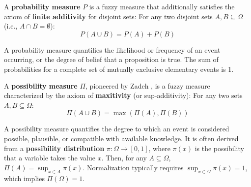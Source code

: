 \begin{definition}
A \textbf{probability measure} $P$ is a fuzzy measure that additionally satisfies the axiom of \textbf{finite additivity} for disjoint sets:
For any two disjoint sets $A, B \subseteq \Omega$ (i.e., $A \cap B = \emptyset$):
\[ P(A \cup B) = P(A) + P(B) \]
\end{definition}
A probability measure quantifies the likelihood or frequency of an event occurring, or the degree of belief that a proposition is true. The sum of probabilities for a complete set of mutually exclusive elementary events is 1.

\begin{definition}
A \textbf{possibility measure} $\Pi$, pioneered by Zadeh \cite{Zadeh1978}, is a fuzzy measure characterized by the axiom of \textbf{maxitivity} (or sup-additivity):
For any two sets $A, B \subseteq \Omega$:
\[ \Pi(A \cup B) = \max(\Pi(A), \Pi(B)) \]
\end{definition}
A possibility measure quantifies the degree to which an event is considered possible, plausible, or compatible with available knowledge. It is often derived from a \textbf{possibility distribution} $\pi: \Omega \to [0, 1]$, where $\pi(x)$ is the possibility that a variable takes the value $x$. Then, for any $A \subseteq \Omega$, $\Pi(A) = \sup_{x \in A} \pi(x)$. Normalization typically requires $\sup_{x \in \Omega} \pi(x) = 1$, which implies $\Pi(\Omega) = 1$.

